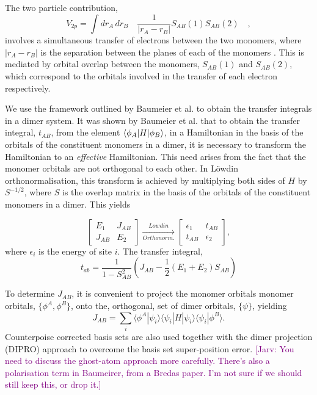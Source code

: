 \documentclass[aps,physrev,reprint,superscriptaddress,nofootinbib,amsmath,amssymb,a4paper]{revtex4-2}
\DeclarePairedDelimiter\bra{\langle}{\rvert}
\DeclarePairedDelimiter\ket{\lvert}{\rangle}
\newcommand{\jarv}[1]{\textcolor{purple}{[Jarv: #1]}}
\begin{document}
The two particle contribution,
\begin{equation}
    V_{2p} = \int dr_A \, dr_B \quad \frac{1}{|r_A-r_B|} S_{AB}(1)S_{AB}(2) \quad,
\end{equation}
%
involves a simultaneous transfer of electrons between the two monomers, where $|r_A-r_B|$ is the separation between the planes of each of the monomers . 
This is mediated by orbital overlap between the monomers, $S_{AB}(1)$ and $S_{AB}(2)$, which correspond to the orbitals involved in the transfer of each electron respectively.

We use the framework outlined by Baumeier et al. to obtain the transfer integrals in a dimer system. 
It was shown by Baumeier et al. that to obtain the transfer integral, $t_{AB}$, from the element $\bra{\phi_A}H\ket{\phi_B}$, in a Hamiltonian in the basis of the orbitals of the constituent monomers in a dimer, it is necessary to transform the Hamiltonian to an \textit{effective} Hamiltonian. 
This need arises from the fact that the monomer orbitals are not orthogonal to each other. 
In L\"owdin orthonormalisation, this transform is achieved by multiplying both sides of $H$ by $S^{-1/2}$, where $S$ is the overlap matrix in the basis of the orbitals of the constituent monomers in a dimer. 
This yields

\begin{equation}
    \begin{bmatrix}
        E_1&J_{AB}\\
        J_{AB}&E_2
    \end{bmatrix}
    \xrightarrow[Orthonorm.]{Lowdin}
    \begin{bmatrix}
     \epsilon_1&t_{AB}\\
     t_{AB}&\epsilon_2
    \end{bmatrix},
\end{equation}
%
where $\epsilon_i$ is the energy of site $i$. 
The transfer integral,
\begin{equation}
    t_{ab} = \frac{1}{1-S_{AB}^2}\left(J_{AB} -\frac{1}{2}\left(E_1+E_2\right)S_{AB}\right)
\end{equation}

To determine $J_{AB}$, it is convenient to project the monomer orbitals monomer orbitals, $\{\phi^A,\phi^B\}$, onto the, orthogonal, set of dimer orbitals, $\{\psi\}$, yielding 
\begin{equation}
    J_{AB} = \sum_i\langle\phi^A|\psi_i\rangle\langle\psi_i|H|\psi_i\rangle\langle\psi_i|\phi^B\rangle .
\end{equation}
%
Counterpoise corrected basis sets are also used together with the dimer projection (DIPRO) approach to overcome the basis set super-position error. 
\jarv{You need to discuss the ghost-atom approach more carefully. There's also a polarisation term in Baumeirer, from a Bredas paper. I'm not sure if we should still keep this, or drop it.}
\end{document}
